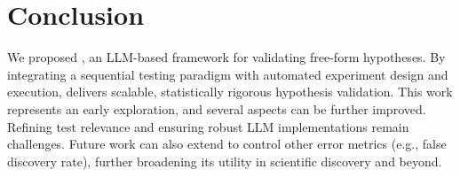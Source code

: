 \vspace{-0.5em}
\section{Conclusion}
We proposed \mname, an LLM-based framework for validating free-form hypotheses. 
By integrating a sequential testing paradigm with automated experiment design and execution, \mname delivers scalable, statistically rigorous hypothesis validation. This work represents an early exploration, and several aspects can be further improved.
Refining test relevance and ensuring robust LLM implementations remain challenges. 
Future work can also extend \mname to control other error metrics (e.g., false discovery rate), further broadening its utility in scientific discovery and beyond.


